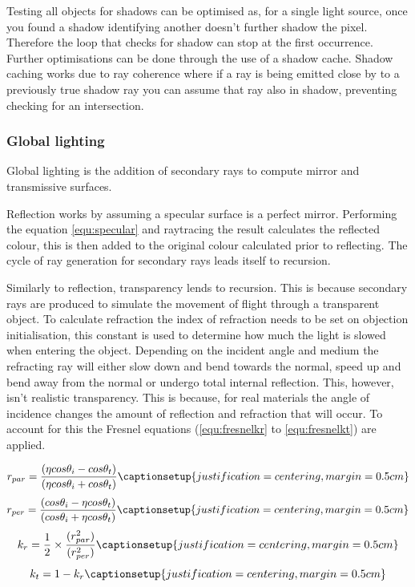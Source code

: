 \documentclass{article}
\begin{document}
Testing all objects for shadows can be optimised as, for a single light source, once you found a shadow identifying another doesn't further shadow the pixel. Therefore the loop that checks for shadow can stop at the first occurrence. Further optimisations can be done through the use of a shadow cache. Shadow caching works due to ray coherence where if a ray is being emitted close by to a previously true shadow ray you can assume that ray also in shadow, preventing checking for an intersection.

\subsubsection{Global lighting}
Global lighting is the addition of secondary rays to compute mirror and transmissive surfaces. 

Reflection works by assuming a specular surface is a perfect mirror. Performing the equation \ref{equ:specular} and raytracing the result calculates the reflected colour, this is then added to the original colour calculated prior to reflecting. The cycle of ray generation for secondary rays leads itself to recursion. 

Similarly to reflection, transparency lends to recursion. This is because secondary rays are produced to simulate the movement of flight through a transparent object. To calculate refraction the index of refraction needs to be set on objection initialisation, this constant is used to determine how much the light is slowed when entering the object. Depending on the incident angle and medium the refracting ray will either slow down and bend towards the normal, speed up and bend away from the normal or undergo total internal reflection. This, however, isn't realistic transparency. This is because, for real materials the angle of incidence changes the amount of reflection and refraction that will occur. To account for this the Fresnel equations (\ref{equ:fresnelkr} to \ref{equ:fresnelkt}) are applied.

\begin{equation}
r_{par} = \frac{(\eta cos\theta _i - cos \theta _t)}{(\eta cos\theta _i + cos \theta _t)}
\captionsetup{justification=centering,margin=0.5cm}
\label{equ:fresnelrpar}
\end{equation}
\begin{equation}
r_{per} = \frac{(cos\theta _i - \eta cos \theta _t)}{(cos\theta _i + \eta cos \theta _t)}
\captionsetup{justification=centering,margin=0.5cm}
\label{equ:fresnelrper}
\end{equation}
\begin{equation}
k_r = \frac{1}{2}\times\frac{(r_{par}^2)}{(r_{per}^2)}
\captionsetup{justification=centering,margin=0.5cm}
\label{equ:fresnelkr}
\end{equation}
\begin{equation}
k_t = 1 - k_r
\captionsetup{justification=centering,margin=0.5cm}
\label{equ:fresnelkt}
\end{equation}
\end{document}
